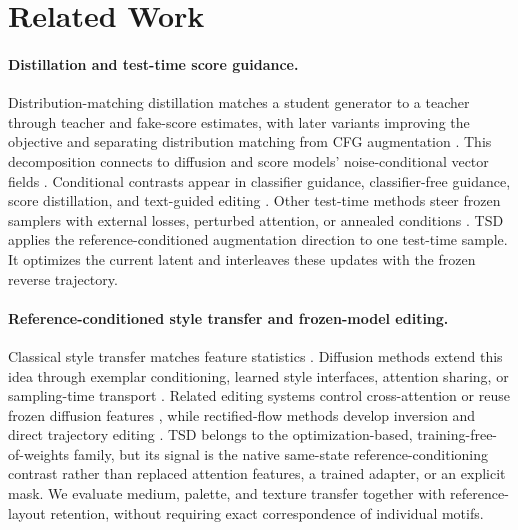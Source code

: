 \section{Related Work}
\label{sec:related}

\paragraph{Distillation and test-time score guidance.}
Distribution-matching distillation matches a student generator to a teacher
through teacher and fake-score estimates, with later variants improving the
objective and separating distribution matching from CFG augmentation
\citep{yin2024dmd,yin2024dmd2,liu2025decoupled}. This decomposition connects
to diffusion and score models' noise-conditional vector fields
\citep{ho2020ddpm,song2021sde}. Conditional contrasts appear in classifier
guidance, classifier-free guidance, score distillation, and text-guided editing
\citep{dhariwal2021diffusion,ho2022cfg,poole2023dreamfusion,hertz2023dds,
nam2024cds,chinchuthakun2025lusd}.
Other test-time methods steer frozen samplers with external losses, perturbed
attention, or annealed conditions
\citep{bansal2023universal,ahn2024pag,hong2024seg,sadat2024cads}. TSD applies the reference-conditioned augmentation direction to one
test-time sample. It optimizes the current latent and interleaves these
updates with the frozen reverse trajectory.

\paragraph{Reference-conditioned style transfer and frozen-model editing.}
Classical style transfer matches feature statistics
\citep{gatys2016style,huang2017adain}. Diffusion methods extend this idea
through exemplar conditioning, learned style interfaces, attention sharing,
or sampling-time transport
\citep{yang2023paint,sohn2023styledrop,ye2023ipadapter,hertz2024stylealigned,
chung2024styleinjection,deng2024zstar,wang2024instantstyle,xu2025stylessp,
he2025semantix,rout2025rbmodulation}. Related editing systems control cross-attention or reuse
frozen diffusion features \citep{hertz2023prompt,tumanyan2023plugplay}, while
rectified-flow methods develop inversion and direct trajectory editing
\citep{rout2025rfinversion,kulikov2025flowedit}. TSD belongs to the
optimization-based, training-free-of-weights family, but its signal is the
native same-state reference-conditioning contrast rather than replaced
attention features, a trained adapter, or an explicit mask. We evaluate medium, palette, and texture transfer together with reference-layout
retention, without requiring exact correspondence of individual motifs.

